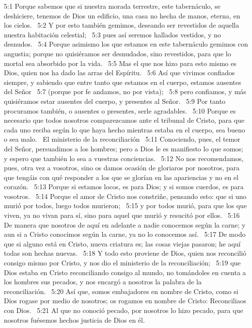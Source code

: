 5:1 Porque sabemos que si nuestra morada terrestre, este tabernáculo, se deshiciere, tenemos de Dios un edificio, una casa no hecha de manos, eterna, en los cielos.  
5:2 Y por esto también gemimos, deseando ser revestidos de aquella nuestra habitación celestial;  
5:3 pues así seremos hallados vestidos, y no desnudos.  
5:4 Porque asimismo los que estamos en este tabernáculo gemimos con angustia; porque no quisiéramos ser desnudados, sino revestidos, para que lo mortal sea absorbido por la vida.  
5:5 Mas el que nos hizo para esto mismo es Dios, quien nos ha dado las arras del Espíritu.  
5:6 Así que vivimos confiados siempre, y sabiendo que entre tanto que estamos en el cuerpo, estamos ausentes del Señor  
5:7 (porque por fe andamos, no por vista);  
5:8 pero confiamos, y más quisiéramos estar ausentes del cuerpo, y presentes al Señor.  
5:9 Por tanto procuramos también, o ausentes o presentes, serle agradables.  
5:10 Porque es necesario que todos nosotros comparezcamos ante el tribunal de Cristo, para que cada uno reciba según lo que haya hecho mientras estaba en el cuerpo, sea bueno o sea malo.  
El ministerio de la reconciliación  
5:11 Conociendo, pues, el temor del Señor, persuadimos a los hombres; pero a Dios le es manifiesto lo que somos; y espero que también lo sea a vuestras conciencias.  
5:12 No nos recomendamos, pues, otra vez a vosotros, sino os damos ocasión de gloriaros por nosotros, para que tengáis con qué responder a los que se glorían en las apariencias y no en el corazón.  
5:13 Porque si estamos locos, es para Dios; y si somos cuerdos, es para vosotros.  
5:14 Porque el amor de Cristo nos constriñe, pensando esto: que si uno murió por todos, luego todos murieron;  
5:15 y por todos murió, para que los que viven, ya no vivan para sí, sino para aquel que murió y resucitó por ellos.  
5:16 De manera que nosotros de aquí en adelante a nadie conocemos según la carne; y aun si a Cristo conocimos según la carne, ya no lo conocemos así.  
5:17 De modo que si alguno está en Cristo, nueva criatura es; las cosas viejas pasaron; he aquí todas son hechas nuevas.  
5:18 Y todo esto proviene de Dios, quien nos reconcilió consigo mismo por Cristo, y nos dio el ministerio de la reconciliación;  
5:19 que Dios estaba en Cristo reconciliando consigo al mundo, no tomándoles en cuenta a los hombres sus pecados, y nos encargó a nosotros la palabra de la reconciliación.  
5:20 Así que, somos embajadores en nombre de Cristo, como si Dios rogase por medio de nosotros; os rogamos en nombre de Cristo: Reconciliaos con Dios.  
5:21 Al que no conoció pecado, por nosotros lo hizo pecado, para que nosotros fuésemos hechos justicia de Dios en él.  
